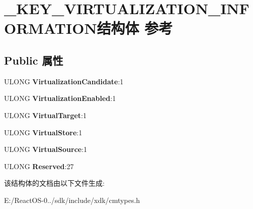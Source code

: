 \hypertarget{struct___k_e_y___v_i_r_t_u_a_l_i_z_a_t_i_o_n___i_n_f_o_r_m_a_t_i_o_n}{}\section{\+\_\+\+K\+E\+Y\+\_\+\+V\+I\+R\+T\+U\+A\+L\+I\+Z\+A\+T\+I\+O\+N\+\_\+\+I\+N\+F\+O\+R\+M\+A\+T\+I\+O\+N结构体 参考}
\label{struct___k_e_y___v_i_r_t_u_a_l_i_z_a_t_i_o_n___i_n_f_o_r_m_a_t_i_o_n}
\subsection*{Public 属性}
\begin{DoxyCompactItemize}
\item 
\mbox{\label{struct___k_e_y___v_i_r_t_u_a_l_i_z_a_t_i_o_n___i_n_f_o_r_m_a_t_i_o_n_a9c4a32a9af83257a762882b7f3ec9313}} 
U\+L\+O\+NG {\bfseries Virtualization\+Candidate}\+:1
\item 
\mbox{\label{struct___k_e_y___v_i_r_t_u_a_l_i_z_a_t_i_o_n___i_n_f_o_r_m_a_t_i_o_n_ae8c2e9b7bb08289d888652e400a80d00}} 
U\+L\+O\+NG {\bfseries Virtualization\+Enabled}\+:1
\item 
\mbox{\label{struct___k_e_y___v_i_r_t_u_a_l_i_z_a_t_i_o_n___i_n_f_o_r_m_a_t_i_o_n_a92bd013b7ef4a543b8a0a3dc076cc6e1}} 
U\+L\+O\+NG {\bfseries Virtual\+Target}\+:1
\item 
\mbox{\label{struct___k_e_y___v_i_r_t_u_a_l_i_z_a_t_i_o_n___i_n_f_o_r_m_a_t_i_o_n_a492abca0154653174144f40087874fe7}} 
U\+L\+O\+NG {\bfseries Virtual\+Store}\+:1
\item 
\mbox{\label{struct___k_e_y___v_i_r_t_u_a_l_i_z_a_t_i_o_n___i_n_f_o_r_m_a_t_i_o_n_ad2db2264592e4e770df7d6294809e7f5}} 
U\+L\+O\+NG {\bfseries Virtual\+Source}\+:1
\item 
\mbox{\label{struct___k_e_y___v_i_r_t_u_a_l_i_z_a_t_i_o_n___i_n_f_o_r_m_a_t_i_o_n_aaffd674c258ca057a83d2794a7efdf6f}} 
U\+L\+O\+NG {\bfseries Reserved}\+:27
\end{DoxyCompactItemize}


该结构体的文档由以下文件生成\+:\begin{DoxyCompactItemize}
\item 
E\+:/\+React\+O\+S-\/0../sdk/include/xdk/cmtypes.\+h\end{DoxyCompactItemize}
